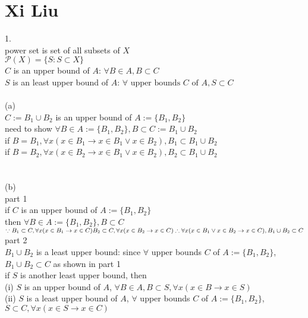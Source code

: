 \documentclass[12pt, border = 4pt, multi]{article} %
\begin{document}
\section*{Xi Liu}
1.\\
power set is set of all subsets of $X$\\
$\mathcal{P}(X) = \{S: S \subset X\}$\\
$C$ is an upper bound of $A$: $\forall B \in A, B \subset C$\\
$S$ is an least upper bound of $A$: $\forall \text{ upper bounds } C \text{ of } A, S \subset C$\\
\\
(a)\\
$C := B_1 \cup B_2$ is an upper bound of $A := \{B_1, B_2\}$\\
need to show $\forall B \in A := \{B_1, B_2\}, B \subset C := B_1 \cup B_2$\\
if $B = B_1, \forall x (x \in B_1 \rightarrow x \in B_1 \vee x \in B_2), B_1 \subset B_1 \cup B_2$\\
if $B = B_2, \forall x (x \in B_2 \rightarrow x \in B_1 \vee x \in B_2), B_2 \subset B_1 \cup B_2$\\
\\
\\
(b)\\
part 1\\
if $C$ is an upper bound of $A := \{B_1, B_2\}$\\
then $\forall B \in A := \{B_1, B_2\}, B \subset C$\\
$\because B_1 \subset C, \forall x(x \in B_1 \rightarrow x \in C)\\
B_2 \subset C, \forall x(x \in B_2 \rightarrow x \in C)\\
\therefore \forall x(x \in B_1 \vee x \in B_2 \rightarrow x \in C), B_1 \cup B_2 \subset C\\$
\\
part 2\\
$B_1 \cup B_2$ is a least upper bound: since $\forall$ upper bounds $C$ of $A := \{B_1, B_2\}$, $B_1 \cup B_2 \subset C$ as shown in part 1\\
if $S$ is another least upper bound, then\\
(i) $S$ is an upper bound of $A$, $\forall B \in A, B \subset S, \forall x (x \in B \rightarrow x \in S)$\\
(ii) $S$ is a least upper bound of $A$, $\forall$ upper bounds $C$ of $A := \{B_1, B_2\}$, $S \subset C, \forall x (x \in S \rightarrow x \in C)$\\
\end{document}
